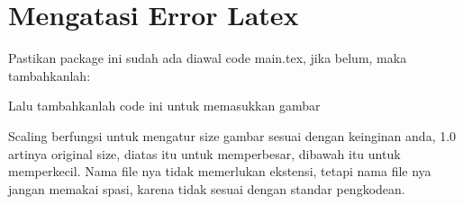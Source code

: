 \section{Mengatasi Error Latex}
Pastikan package ini sudah ada diawal code main.tex, jika belum, maka tambahkanlah:


Lalu tambahkanlah code ini untuk memasukkan gambar


Scaling berfungsi untuk mengatur size gambar sesuai dengan keinginan anda, 1.0 artinya original size, diatas itu untuk memperbesar, dibawah itu untuk memperkecil. Nama file nya tidak memerlukan ekstensi, tetapi nama file nya jangan memakai spasi, karena tidak sesuai dengan standar pengkodean. 